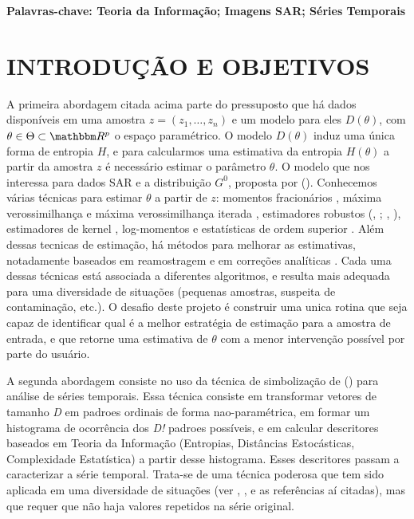 \documentclass[12pt,letterpaper]{article}
\begin{document}
\textbf{Palavras-chave: Teoria da Informação; Imagens SAR; Séries Temporais} 
  
  \newpage
\section*{\centering \textbf{INTRODUÇÃO E OBJETIVOS}} %

A primeira abordagem citada acima parte do pressuposto que há dados disponíveis em uma amostra $z = (z_1,\dots, z_n)$ e um modelo para eles $D(\theta)$, com $\theta \in \Theta \subset \mathbbm R ^ p$ o espaço paramétrico. O modelo $D(\theta)$ induz uma única forma de entropia $H$, e para calcularmos uma estimativa da entropia $H(\theta)$ a partir da amostra $z$ é necessário estimar o parâmetro $\theta$. O modelo que nos interessa para dados SAR e a distribuição $G^0$, proposta por  (\citeyear{FreryMullerYanasse1997}). Conhecemos várias técnicas para estimar $\theta$ a partir de $z$: momentos fracionários \cite{MejailBerllesFreryBustos2003}, máxima verossimilhança e máxima verossimilhança iterada \cite{FreryNetoSouza2004}, estimadores robustos (, \citeyear{BustusLuciniFrery2002}; , \citeyear{AllendeFreryGalbiatiPizarro2006}), estimadores de kernel \cite{GambiniCassettiLuciniFrery2014}, log-momentos e estatísticas de ordem superior \cite{DengLopez2016}. Além dessas tecnicas de estimação, há métodos para melhorar as estimativas, notadamente baseados em reamostragem \cite{CribariFrerySilva2002} e em correções analíticas \cite{SilvaNetoFrery2008}. Cada uma dessas técnicas está associada a diferentes algoritmos, e resulta mais adequada para uma diversidade de situações (pequenas amostras, suspeita de contaminação, etc.). O desafio deste projeto é construir uma unica rotina que seja capaz de identificar qual é a melhor estratégia de estimação para a amostra de entrada, e que retorne uma estimativa de $\theta$ com a menor intervenção possível por parte do usuário.

A segunda abordagem consiste no uso da técnica de simbolização de  (\citeyear{BandtPompe2002}) para análise de séries temporais. Essa técnica consiste em transformar vetores de tamanho \textit{D} em padroes ordinais de forma nao-paramétrica, em formar um histograma de ocorrência dos \textit{D!} padroes possíveis, e em calcular descritores baseados em Teoria da Informação (Entropias, Distâncias Estocásticas, Complexidade Estatística) a partir desse histograma. Esses descritores passam a caracterizar a série temporal. Trata-se de uma técnica poderosa que tem sido aplicada em uma diversidade de situações (ver , \citeyear{RossoOspinaFrery2016}, e as referências aí citadas), mas que requer que não haja valores repetidos na série original.
\end{document}
